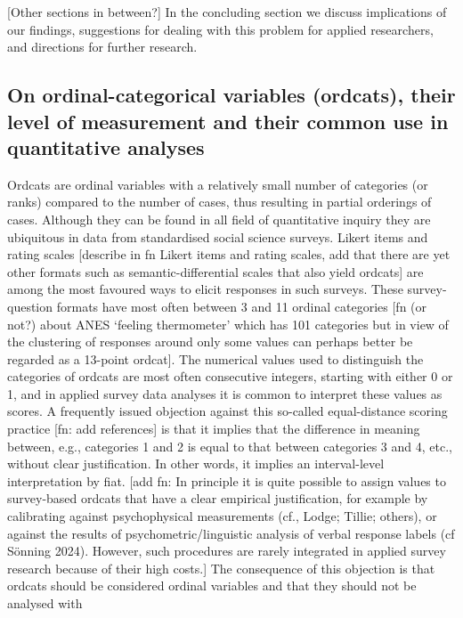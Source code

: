 \documentclass[
  12pt,
]{article}
\theoremstyle{plain}
\theoremstyle{definition}
\theoremstyle{remark}
\begin{document}
{[}Other sections in between?{]} In the concluding section we discuss
implications of our findings, suggestions for dealing with this problem
for applied researchers, and directions for further research.

\subsection{On ordinal-categorical variables (ordcats), their level of
measurement and their common use in quantitative
analyses}\label{on-ordinal-categorical-variables-ordcats-their-level-of-measurement-and-their-common-use-in-quantitative-analyses}

Ordcats are ordinal variables with a relatively small number of
categories (or ranks) compared to the number of cases, thus resulting in
partial orderings of cases. Although they can be found in all field of
quantitative inquiry they are ubiquitous in data from standardised
social science surveys. Likert items and rating scales {[}describe in fn
Likert items and rating scales, add that there are yet other formats
such as semantic-differential scales that also yield ordcats{]} are
among the most favoured ways to elicit responses in such surveys. These
survey-question formats have most often between 3 and 11 ordinal
categories {[}fn (or not?) about ANES `feeling thermometer' which has
101 categories but in view of the clustering of responses around only
some values can perhaps better be regarded as a 13-point ordcat{]}. The
numerical values used to distinguish the categories of ordcats are most
often consecutive integers, starting with either 0 or 1, and in applied
survey data analyses it is common to interpret these values as scores. A
frequently issued objection against this so-called equal-distance
scoring practice {[}fn: add references{]} is that it implies that the
difference in meaning between, e.g., categories 1 and 2 is equal to that
between categories 3 and 4, etc., without clear justification. In other
words, it implies an interval-level interpretation by fiat. {[}add fn:
In principle it is quite possible to assign values to survey-based
ordcats that have a clear empirical justification, for example by
calibrating against psychophysical measurements (cf., Lodge; Tillie;
others), or against the results of psychometric/linguistic analysis of
verbal response labels (cf Sönning 2024). However, such procedures are
rarely integrated in applied survey research because of their high
costs.{]} The consequence of this objection is that ordcats should be
considered ordinal variables and that they should not be analysed with
\end{document}

